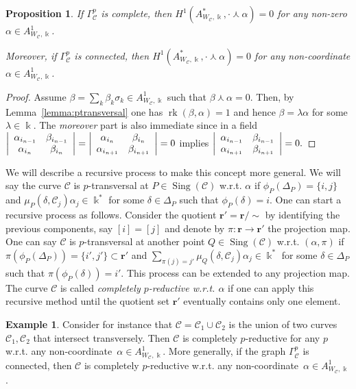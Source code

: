 \documentclass[11pt]{amsart}
\DeclareMathOperator{\Sing}{Sing}
\DeclareMathOperator{\rk}{rk}
\def\cC{\mathcal{C}}
\def\kk{\Bbbk}
\theoremstyle{plain}
\newtheorem{proposition}[thm]{Proposition}
\theoremstyle{definition}
\newtheorem{example}[thm]{Example}
\begin{document}
\begin{proposition}
\label{prop:pairwiseptransversal}
If $\Gamma^p_{\cC}$ is complete, then 
$H^1(A^*_{W_\cC,\kk},\cdot\curlywedge\alpha)=0$ for any non-zero $\alpha\in A^1_{W_\cC,\kk}$. 

Moreover, if $\Gamma^p_{\cC}$ is connected, then 
$H^1(A^*_{W_\cC,\kk},\cdot\curlywedge\alpha)=0$ for any non-coordinate $\alpha\in A^1_{W_\cC,\kk}$.
\end{proposition}

\begin{proof}
Assume $\beta=\sum_k \beta_k\sigma_k\in A^1_{W_\cC,\kk}$ such that $\beta \curlywedge\alpha=0$. Then, by Lemma~\ref{lemma:ptransversal}
one has $\rk (\beta,\alpha)=1$ and hence $\beta=\lambda\alpha$ for some $\lambda\in\kk$. The \emph{moreover} part is also immediate since
in a field 
$
\left|
\array{cc}
\alpha_{i_{n-1}} & \beta_{i_{n-1}}\\
\alpha_{i_{n}} & \beta_{i_{n}}
\endarray
\right|= 
\left|
\array{cc}
\alpha_{i_{n}} & \beta_{i_{n}}\\
\alpha_{i_{n+1}} & \beta_{i_{n+1}}
\endarray
\right|=0
$
implies
$
\left|
\array{cc}
\alpha_{i_{n-1}} & \beta_{i_{n-1}}\\
\alpha_{i_{n+1}} & \beta_{i_{n+1}}
\endarray
\right|=0.
$
\end{proof}

We will describe a recursive process to make this concept more general.
We will say the curve $\cC$ is $p$-transversal at $P\in \Sing(\cC)$ w.r.t. $\alpha$ if $\phi_P(\Delta_P)=\{i,j\}$ and 
$\mu_P(\delta,\cC_j)\alpha_j\in\kk^*$ for some $\delta\in\Delta_P$ such that $\phi_P(\delta)=i$. 
One can start a recursive process as follows. Consider the quotient $\mathbf{r}'=\mathbf{r}/\sim$ by identifying the previous components, say $[i]=[j]$ and denote by $\pi:\mathbf{r}\to \mathbf{r}'$ the projection map. One can say $\cC$ is $p$-transversal at another point $Q\in\Sing(\cC)$ w.r.t. $(\alpha,\pi)$ if $\pi(\phi_P(\Delta_P))=\{i',j'\}\subset\mathbf{r}'$ and $\sum_{\pi(j)=j'}\mu_Q(\delta,\cC_{j})\alpha_j\in\kk^*$ 
for some $\delta\in\Delta_P$ such that $\pi(\phi_P(\delta))=i'$. This process can be extended to any projection map.
The curve $\cC$ is called \emph{completely $p$-reductive w.r.t. $\alpha$} if one can apply this recursive method until the quotient 
set $\mathbf{r}'$ eventually contains only one element.

\begin{example}
	\label{exam:TransversalCurves}
	Consider for instance that $\cC = \cC_1 \cup  \cC_2$ is the union of two curves  $\cC_1,  \cC_2$ that intersect transversely. 
	Then $\cC$ is completely $p$-reductive for any $p$ w.r.t. any non-coordinate~$\alpha\in A^1_{W_\cC,\kk}$. More generally, if the graph $\Gamma^p_\cC$ is connected, then $\cC$ is completely $p$-reductive w.r.t. any non-coordinate~$\alpha\in A^1_{W_\cC,\kk}$.
\end{example}
\end{document}
